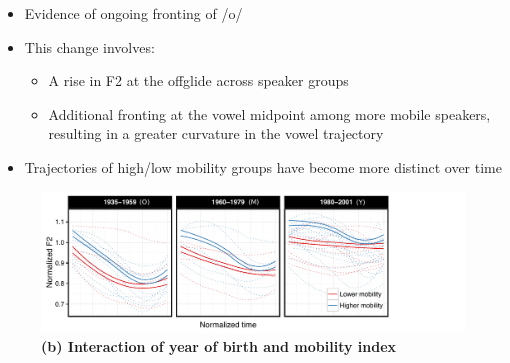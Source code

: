 \documentclass[a0,final]{a0poster}
\begin{document}
\begin{multicols*}{4}
\hspace*{-5cm}
\begin{minipage}{0.125\textwidth}
\vspace*{2cm}
\begin{itemize}
\raggedright
\item{Evidence of ongoing fronting of /o/}
\item{This change involves:\begin{itemize}\item{A rise in F2 at the offglide across speaker groups}\item{Additional fronting at the vowel midpoint among more mobile speakers, resulting in a greater curvature in the vowel trajectory}\end{itemize}}
\item{Trajectories of high/low mobility groups have become more distinct over time}
\end{itemize}
\end{minipage}
\begin{figure}[H]
\includegraphics[scale=1.5]{o_mobility_curve.pdf}
\caption*{\hspace*{-6cm}\textbf{(b) Interaction of year of birth and mobility index}}
\end{figure}

\end{multicols*}
\end{document}
